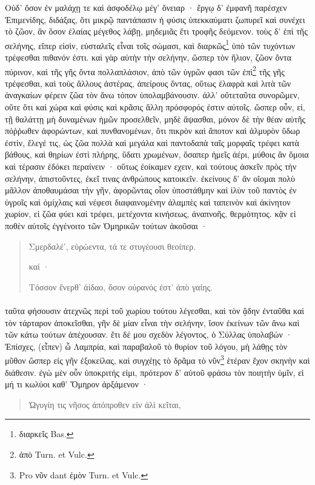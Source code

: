 \documentclass[a4paper, 11pt, oneside, polutonikogreek, german]{article}
\begin{document}
Οὐδ' ὅσον ἐν μαλάχῃ τε καὶ ἀσφοδέλῳ μέγ' ὄνειαρ · ἔργῳ δ' ἐμφανῆ παρέσχεν Ἐπιμενίδης, διδάξας, ὅτι μικρῷ παντάπασιν ἡ φύσις ὑπεκκαύματι ζωπυρεῖ καὶ συνέχει τὸ ζῶον, ἂν ὅσον ἐλαίας μέγεθος λάβῃ, μηδεμιᾶς ἔτι τροφῆς δεόμενον. τοὺς δ' ἐπὶ τῆς σελήνης, εἴπερ εἰσὶν, εὐσταλεῖς εἶναι τοῖς σώμασι, καὶ διαρκῶς\footnote{διαρκεῖς Bas.} ὑπὸ τῶν τυχόντων τρέφεσθαι πιθανόν ἐστι. καὶ γὰρ αὐτὴν τὴν σελήνην, ὥσπερ τὸν ἥλιον, ζῶον ὄντα πύρινον, καὶ τῆς γῆς ὄντα πολλαπλάσιον, ἀπὸ τῶν ὑγρῶν φασι τῶν ἐπὶ\footnote{ἀπὸ Turn. et Vulc.} τῆς γῆς τρέφεσθαι, καὶ τοὺς ἄλλους ἀστέρας, ἀπείρους ὄντας, οὕτως ἐλαφρὰ καὶ λιτὰ τῶν ἀναγκαίων φέρειν ζῶα τὸν ἄνω τόπον ὑπολαμβάνουσιν. ἀλλ' οὔτεταῦτα συνορῶμεν, οὔτε ὅτι καὶ χώρα καὶ φύσις καὶ κρᾶσις ἄλλη πρόσφορός ἐστιν αὐτοῖς. ὥσπερ οὖν, εἰ, τῇ θαλάττῃ μὴ δυναμένων ἡμῶν προσελθεῖν, μηδὲ ἅψασθαι, μόνον δὲ τὴν θέαν αὐτῆς πόῤῥωθεν ἀφορώντων, καὶ πυνθανομένων, ὅτι πικρὸν καὶ ἄποτον καὶ ἁλμυρὸν ὕδωρ ἐστὶν, ἔλεγέ τις, ὡς ζῶα πολλὰ καὶ μεγάλα καὶ παντοδαπὰ ταῖς μορφαῖς τρέφει κατὰ βάθους, καὶ θηρίων ἐστὶ πλήρης, ὕδατι χρωμένων, ὅσαπερ ἡμεῖς ἀέρι, μύθοις ἂν ὅμοια καὶ τέρασιν ἐδόκει περαίνειν · οὕτως ἐοίκαμεν εχειν, καὶ τούτους ἀσκεῖν πρὸς τὴν σελήνην, ἀπιστοῦντες, ἐκεῖ τινας ἀνθρώπους κατοικεῖν. ἐκείνους δ' ἂν οἴομαι πολὺ μᾶλλον ἀποθαυμάσαι τὴν γῆν, ἀφορῶντας οἷον ὑποστάθμην καὶ ἰλὺν τοῦ παντὸς ἐν ὑγροῖς καὶ ὁμίχλαις καὶ νέφεσι διαφαινομένην ἀλαμπὲς καὶ ταπεινὸν καὶ ἀκίνητον χωρίον, εἰ ζῶα φύει καὶ τρέφει, μετέχοντα κινήσεως, ἀναπνοῆς, θερμότητος. κᾂν εἰ ποθὲν αὐτοῖς ἐγγένοιτο τῶν Ὁμηρικῶν τούτων ἀκοῦσαι ·
\begin{quotation}
Σμερδαλέ', εὐρώεντα, τά τε στυγέουσι θεοίπερ.

καί ·

Τόσσον ἔνερθ' ἀίδαο, ὅσον οὐρανός ἐστ' ἀπὸ γαίης.
\end{quotation}
\paragraph{}
ταῦτα φήσουσιν ἀτεχνῶς περὶ τοῦ χωρίου τούτου λέγεσθαι, καὶ τὸν ᾅδην ἐνταῦθα καὶ τὸν τάρταρον ἀποκεῖσθαι, γῆν δὲ μίαν εἶναι τὴν σελήνην, ἴσον ἐκείνων τῶν ἄνω καὶ τῶν κάτω τούτων ἀπέχουσαν. ἔτι δέ μου σχεδὸν λέγοντος, ὁ Σύλλας ὑπολαβών · Ἐπίσχες, (εἶπεν) ὦ Λαμπρία, καὶ παραβαλοῦ τὸ θυρίον τοῦ λόγου, μὴ λάθῃς τὸν μῦθον ὥσπερ εἰς γῆν ἐξοκείλας, καὶ συγχέῃς τὸ δρᾶμα τὸ νῦν\footnote{Pro νῦν dant ἐμὸν Turn. et Vulc.} ἑτέραν ἔχον σκηνὴν καὶ διάθεσιν. ἐγὼ μὲν οὖν ὑποκριτής εἰμι, πρότερον δ' αὐτοῦ φράσω τὸν ποιητὴν ὑμῖν, εἰ μή τι κωλύοι καθ' Ὅμηρον ἀρξάμενον ·
\begin{quotation}
Ὠγυγίη τις νῆσος ἀπόπροθεν εἰν ἁλὶ κεῖται,
\end{quotation}
\end{document}
